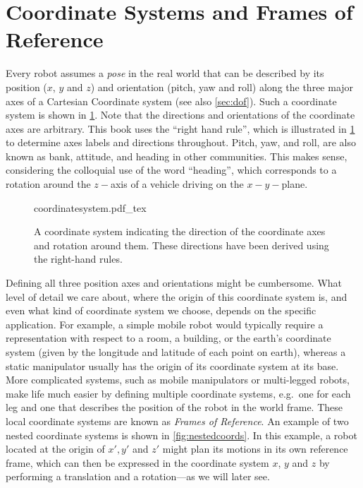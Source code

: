 \section{Coordinate Systems and Frames of Reference}\label{sec:coordsystems}


Every robot assumes a \textsl{pose} in the real world that can be described by its position ($x$, $y$ and $z$) and orientation (pitch, yaw and roll) along the three major axes of a Cartesian Coordinate system (see also \cref{sec:dof}).
Such a coordinate system is shown in \cref{fig:coordinatesystem}. Note that the directions and orientations of the coordinate axes are arbitrary. This book uses the ``right hand rule'', which is illustrated in \cref{fig:coordinatesystem} to determine axes labels and directions throughout.
Pitch, yaw, and roll, are also known as bank, attitude, and heading in other communities. This makes sense, considering the colloquial use of the word ``heading'', which corresponds to a rotation around the $z-$axis of a vehicle driving on the $x-y-$plane.

\begin{figure}
    \centering
    \def\svgwidth{0.8\textwidth}
    {coordinatesystem.pdf_tex}
    \caption{A coordinate system indicating the direction of the coordinate axes and rotation around them. These directions have been derived using the right-hand rules.}
    \label{fig:coordinatesystem}
\end{figure}

Defining all three position axes and orientations might be cumbersome. What level of detail we care about, where the origin of this coordinate system is, and even what kind of coordinate system we choose, depends on the specific application.
For example, a simple mobile robot would typically require a representation with respect to a room, a building, or the earth's coordinate system (given by the longitude and latitude of each point on earth), whereas a static manipulator usually has the origin of its coordinate system at its base.
More complicated systems, such as mobile manipulators or multi-legged robots, make life much easier by defining multiple coordinate systems, e.g.\ one for each leg and one that describes the position of the robot in the world frame. These local coordinate systems are known as \textsl{Frames of Reference}.
An example of two nested coordinate systems is shown in \cref{fig:nestedcoords}. In this example, a robot located at the origin of $x',y'$ and $z'$ might plan its motions in its own reference frame, which can then be expressed in the coordinate system $x$, $y$ and $z$ by performing a translation and a rotation---as we will later see.

